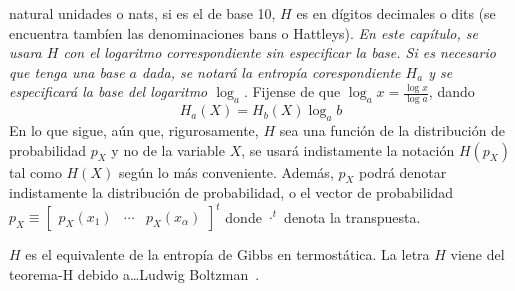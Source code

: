 natural unidades o  nats, si es el de  base 10, $H$ es en  d\'igitos decimales o
dits (se encuentra tamb\'ien las  denominaciones bans o Hattleys).  {\it En este
  cap\'itulo, se usara  $H$ con el logaritmo correspondiente  sin especificar la
  base.  Si es necesario que tenga  una base $a$ dada, se notar\'a la entrop\'ia
  corespondiente  $H_a$ y  se especificar\'a  la base  del  logaritmo $\log_a$}.
Fijense de que $\log_a x = \frac{\log x}{\log a}$, dando
%
\[
H_a(X)  =  H_b(X)  \log_a b
\]
%
En  lo  que  sigue, a\'un  que,  rigurosamente,  $H$  sea  una funci\'on  de  la
distribuci\'on  de  probabilidad $p_X$  y  no de  la  variable  $X$, se  usar\'a
indistamente  la   notaci\'on  $H(p_X)$  tal   como  $H(X)$  seg\'un   lo  m\'as
conveniente.  Adem\'as, $p_X$ podr\'a  denotar indistamente la distribuci\'on de
probabilidad, o el vector de probabilidad $p_X \equiv \begin{bmatrix} p_X(x_1) &
  \cdots & p_X(x_\alpha) \end{bmatrix}^t$ donde $\cdot^t$ denota la transpuesta.

$H$ es el equivalente de la  entrop\'ia de Gibbs en termost\'atica. La letra $H$
viene del teorema-H debido a\ldots Ludwig Boltzman~\cite{Jay65}.

